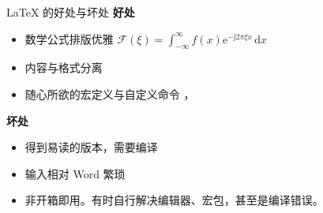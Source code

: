 \begin{frame}[fragile]{\LaTeX{} 的好处与坏处}
    \textbf{好处}
    \begin{itemize}
        \item 数学公式排版优雅 \quad $\mathcal{F}(\xi)=\int_{-\infty}^{\infty} f(x)\mathrm{e}^{-\mathrm{j}2\pi \xi x}\,\mathrm{d}x$
        \item 内容与格式分离
        \item 随心所欲的宏定义与自定义命令 ，
    \end{itemize}

    \pause

    \vspace{2em}
    \textbf{坏处}
    \begin{itemize}
        \item 得到易读的版本，需要编译
        \item 输入相对 Word 繁琐
        \item 非开箱即用。有时自行解决编辑器、宏包，甚至是编译错误。
    \end{itemize}

\end{frame}
